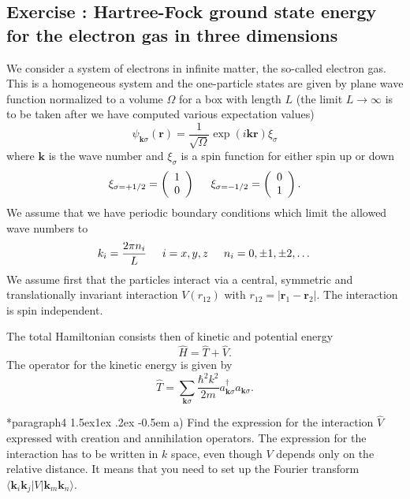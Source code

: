 \documentclass[%
oneside,                 %
final,                   %
10pt]{article}
\makeatletter
\newenvironment{doconceexercise}{}{}
\newcounter{doconceexercisecounter}
\newcommand\subex{\@startsection*{paragraph}{4}{\z@}%
                  {1.5ex\@plus1ex \@minus.2ex}%
                  {-0.5em}%
                  {\normalfont\normalsize\bfseries}}
\makeatother
\begin{document}
\begin{doconceexercise}

\subsection*{Exercise \thedoconceexercisecounter: Hartree-Fock ground state energy for the  electron gas in three dimensions}


We consider a system of electrons in infinite matter, the so-called electron gas. This is a homogeneous system and the one-particle states are given by plane wave function normalized to a volume $\Omega$ 
for a box with length $L$ (the limit $L\rightarrow \infty$ is to be taken after we have computed various expectation values)
\[
\psi_{\mathbf{k}\sigma}(\mathbf{r})= \frac{1}{\sqrt{\Omega}}\exp{(i\mathbf{kr})}\xi_{\sigma}
\]
where $\mathbf{k}$ is the wave number and  $\xi_{\sigma}$ is a spin function for either spin up or down
\[ 
\xi_{\sigma=+1/2}=\left(\begin{array}{c} 1 \\ 0 \end{array}\right) \hspace{0.5cm}
\xi_{\sigma=-1/2}=\left(\begin{array}{c} 0 \\ 1 \end{array}\right).
\]
We assume that we have periodic boundary conditions which limit the allowed wave numbers to
\[
k_i=\frac{2\pi n_i}{L}\hspace{0.5cm} i=x,y,z \hspace{0.5cm} n_i=0,\pm 1,\pm 2, \dots
\]
We assume first that the particles interact via a central, symmetric and translationally invariant
interaction  $V(r_{12})$ with
$r_{12}=|\mathbf{r}_1-\mathbf{r}_2|$.  The interaction is spin independent.

The total Hamiltonian consists then of kinetic and potential energy
\[
\hat{H} = \hat{T}+\hat{V}.
\]
The operator for the kinetic energy is given by
\[
\hat{T}=\sum_{\mathbf{k}\sigma}\frac{\hbar^2k^2}{2m}a_{\mathbf{k}\sigma}^{\dagger}a_{\mathbf{k}\sigma}.
\]


\subex{a)}
Find the expression for the interaction
$\hat{V}$ expressed with creation and annihilation operators.   The expression for the interaction
has to be written in  $k$ space, even though $V$ depends only on the relative distance. It means that you need to set up the Fourier transform $\langle \mathbf{k}_i\mathbf{k}_j| V | \mathbf{k}_m\mathbf{k}_n\rangle$.



\end{doconceexercise}
\end{document}

